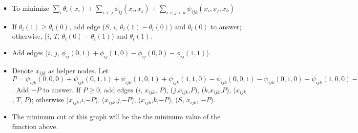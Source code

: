 \begin{itemize}
\begin{itemize}
\begin{itemize}
            \end{itemize}
        \item To minimize $\sum_i \theta_i (x_i) + \sum_{i< j} \phi_{ij} (x_i, x_j) + \sum_{i< j< k}  \psi_{ijk} (x_i, x_j, x_k)$
        \item If $\theta_i(1)\geq\theta_i(0)$, add edge ($S$, $i$, $\theta_i(1)-\theta_i(0)$) and $\theta_i(0)$ to answer; otherwise, ($i$, $T$, $\theta_i(0)-\theta_i(1)$) and $\theta_i(1)$.
        \item Add edges ($i$, $j$, $\phi_{ij}(0,1)+\phi_{ij}(1,0)-\phi_{ij}(0,0)-\phi_{ij}(1,1)$).
        \item Denote $x_{ijk}$ as helper nodes. Let $P=\psi_{ijk}(0,0,0)+\psi_{ijk}(0,1,1)+\psi_{ijk}(1,0,1)+\psi_{ijk}(1,1,0)-\psi_{ijk}(0,0,1)-\psi_{ijk}(0,1,0)-\psi_{ijk}(1,0,0)-\psi_{ijk}(1,1,1)$. Add $-P$ to answer. If $P \geq 0$, add edges ($i$, $x_{ijk}$, $P$), ($j$,$x_{ijk}$,$P$), ($k$,$x_{ijk}$,$P$), ($x_{ijk}$, $T$, $P$); otherwise ($x_{ijk}$,$i$,$-P$), ($x_{ijk}$,$j$,$-P$), ($x_{ijk}$,$k$,$-P$), ($S$, $x_{ijk}$, $-P$).
        \item The minimum cut of this graph will be the the minimum value of the function above.
    \end{itemize}
\end{itemize}
